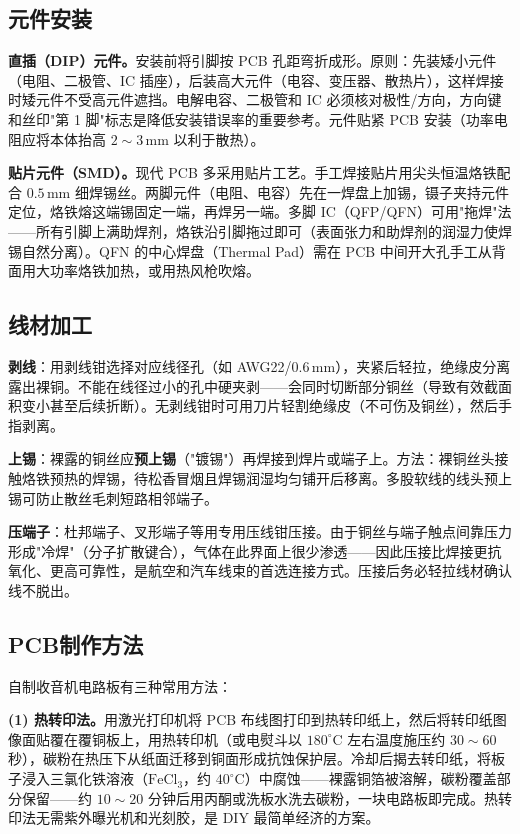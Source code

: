 \documentclass[12pt,UTF8]{ctexbook}
\begin{document}
\subsection{元件安装}

\textbf{直插（DIP）元件。}安装前将引脚按 PCB 孔距弯折成形。原则：先装矮小元件（电阻、二极管、IC 插座），后装高大元件（电容、变压器、散热片），这样焊接时矮元件不受高元件遮挡。电解电容、二极管和 IC 必须核对极性/方向，方向键和丝印"第 1 脚"标志是降低安装错误率的重要参考。元件贴紧 PCB 安装（功率电阻应将本体抬高 $2\sim3\,\mathrm{mm}$ 以利于散热）。

\textbf{贴片元件（SMD）。}现代 PCB 多采用贴片工艺。手工焊接贴片用尖头恒温烙铁配合 $0.5\,\mathrm{mm}$ 细焊锡丝。两脚元件（电阻、电容）先在一焊盘上加锡，镊子夹持元件定位，烙铁熔这端锡固定一端，再焊另一端。多脚 IC（QFP/QFN）可用"拖焊"法——所有引脚上满助焊剂，烙铁沿引脚拖过即可（表面张力和助焊剂的润湿力使焊锡自然分离）。QFN 的中心焊盘（Thermal Pad）需在 PCB 中间开大孔手工从背面用大功率烙铁加热，或用热风枪吹熔。

\subsection{线材加工}

\textbf{剥线}：用剥线钳选择对应线径孔（如 AWG22/$0.6\,\mathrm{mm}$），夹紧后轻拉，绝缘皮分离露出裸铜。不能在线径过小的孔中硬夹剥——会同时切断部分铜丝（导致有效截面积变小甚至后续折断）。无剥线钳时可用刀片轻割绝缘皮（不可伤及铜丝），然后手指剥离。

\textbf{上锡}：裸露的铜丝应\textbf{预上锡}（"镀锡"）再焊接到焊片或端子上。方法：裸铜丝头接触烙铁预热的焊锡，待松香冒烟且焊锡润湿均匀铺开后移离。多股软线的线头预上锡可防止散丝毛刺短路相邻端子。

\textbf{压端子}：杜邦端子、叉形端子等用专用压线钳压接。由于铜丝与端子触点间靠压力形成"冷焊"（分子扩散键合），气体在此界面上很少渗透——因此压接比焊接更抗氧化、更高可靠性，是航空和汽车线束的首选连接方式。压接后务必轻拉线材确认线不脱出。

\subsection{PCB制作方法}

自制收音机电路板有三种常用方法：

\textbf{(1) 热转印法。}用激光打印机将 PCB 布线图打印到热转印纸上，然后将转印纸图像面贴覆在覆铜板上，用热转印机（或电熨斗以 $180^\circ\mathrm{C}$ 左右温度施压约 $30\sim60$ 秒），碳粉在热压下从纸面迁移到铜面形成抗蚀保护层。冷却后揭去转印纸，将板子浸入三氯化铁溶液（$\mathrm{FeCl_3}$，约 $40^\circ\mathrm{C}$）中腐蚀——裸露铜箔被溶解，碳粉覆盖部分保留——约 $10\sim20$ 分钟后用丙酮或洗板水洗去碳粉，一块电路板即完成。热转印法无需紫外曝光机和光刻胶，是 DIY 最简单经济的方案。
\end{document}
